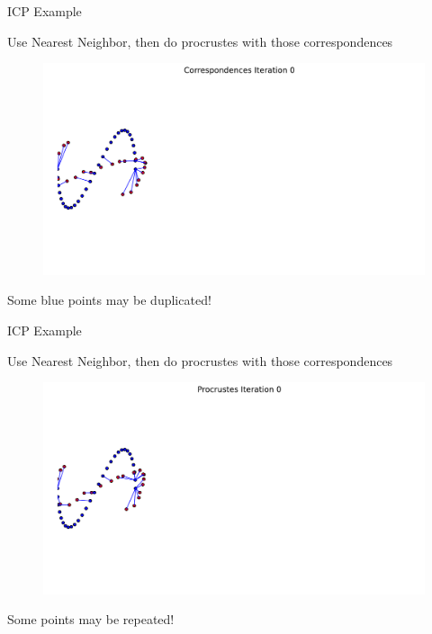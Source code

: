 \documentclass{beamer}
\begin{document}
\begin{frame}{ICP Example}

Use Nearest Neighbor, then do procrustes with those correspondences

\begin{figure}[t]
\centering
    \includegraphics[width=\textwidth]{ICPExample/ICP0_3.pdf}%
\end{figure}

Some blue points may be duplicated!

\end{frame}


\begin{frame}{ICP Example}

Use Nearest Neighbor, then do procrustes with those correspondences

\begin{figure}[t]
\centering
    \includegraphics[width=\textwidth]{ICPExample/ICP0_4.pdf}%
\end{figure}

Some points may be repeated!

\end{frame}
\end{document}
